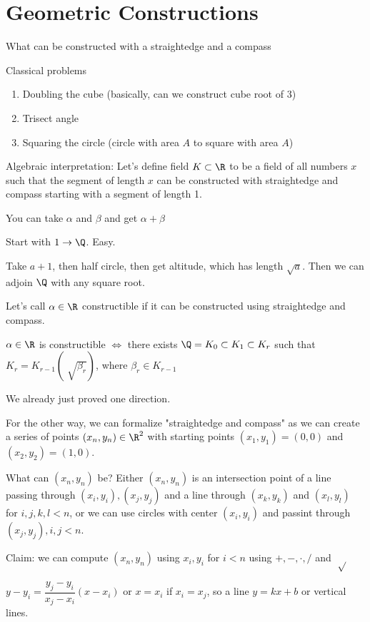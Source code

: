 \documentclass[twoside, 10pt]{article}
\begin{document}
\section{Geometric Constructions}
What can be constructed with a straightedge and a compass

Classical problems
\begin{enumerate}
    \item Doubling the cube (basically, can we construct cube root of 3)
    \item Trisect angle
    \item Squaring the circle (circle with area $A$ to square with area $A$)
\end{enumerate}

Algebraic interpretation: Let's define field $K \subset \R$ to be a field of all numbers $x$ such that the segment of length $x$ can be constructed with straightedge and compass starting with a segment of length 1.

You can take $\alpha$ and $\beta$ and get $\alpha + \beta$

Start with $1 \to \Q$. Easy.

Take $a + 1$, then half circle, then get altitude, which has length $\sqrt{a}$. Then we can adjoin $\Q$ with any square root.

Let's call $\alpha \in \R$ constructible if it can be constructed using straightedge and compass. 

\begin{thm}
    $\alpha \in \R$ is constructible $\iff$ there exists $\Q = K_0 \subset K_1 \subset K_r$ such that $K_r = K_{r-1}(\sqrt[]{\beta_r})$, where $\beta_r \in K_{r-1}$
\end{thm}
We already just proved one direction.

For the other way, we can formalize "straightedge and compass" as we can create a series of points $(x_n, y_n) \in \R^2$ with starting points $(x_1, y_1) = (0, 0)$ and $(x_2, y_2) = (1, 0)$.

What can $(x_n, y_n)$ be? Either $(x_n, y_n)$ is an intersection point of a line passing through $(x_i, y_i), (x_j, y_j)$ and a line through $(x_k, y_k)$ and $(x_l, y_l)$ for $i, j, k, l < n$, or we can use circles with center $(x_i, y_i)$ and passint through $(x_j, y_j), i, j < n$.

Claim: we can compute $(x_n, y_n)$ using $x_i, y_i$ for $i < n$ using $+, -, \cdot, /$ and $\sqrt[]{}$

$y - y_i = \dfrac{y_j - y_i}{x_j - x_i}(x - x_i)$ or $x = x_i$ if $x_i = x_j$, so a line $y = kx + b$ or vertical lines.
\end{document}
